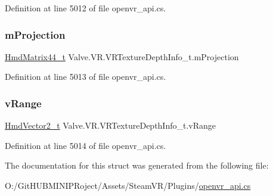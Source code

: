 Definition at line 5012 of file openvr\+\_\+api.\+cs.

\mbox{\label{struct_valve_1_1_v_r_1_1_v_r_texture_depth_info__t_a384611be9820716fee5ed9ac8aeacf96}} 
\subsubsection{\texorpdfstring{mProjection}{mProjection}}
{\footnotesize\ttfamily \mbox{\hyperlink{struct_valve_1_1_v_r_1_1_hmd_matrix44__t}{Hmd\+Matrix44\+\_\+t}} Valve.\+V\+R.\+V\+R\+Texture\+Depth\+Info\+\_\+t.\+m\+Projection}



Definition at line 5013 of file openvr\+\_\+api.\+cs.

\mbox{\label{struct_valve_1_1_v_r_1_1_v_r_texture_depth_info__t_a8072db262e6cb1b789506a5f8b05970b}} 
\subsubsection{\texorpdfstring{vRange}{vRange}}
{\footnotesize\ttfamily \mbox{\hyperlink{struct_valve_1_1_v_r_1_1_hmd_vector2__t}{Hmd\+Vector2\+\_\+t}} Valve.\+V\+R.\+V\+R\+Texture\+Depth\+Info\+\_\+t.\+v\+Range}



Definition at line 5014 of file openvr\+\_\+api.\+cs.



The documentation for this struct was generated from the following file\+:\begin{DoxyCompactItemize}
\item 
O\+:/\+Git\+H\+U\+B\+M\+I\+N\+I\+P\+Roject/\+Assets/\+Steam\+V\+R/\+Plugins/\mbox{\hyperlink{openvr__api_8cs}{openvr\+\_\+api.\+cs}}\end{DoxyCompactItemize}
